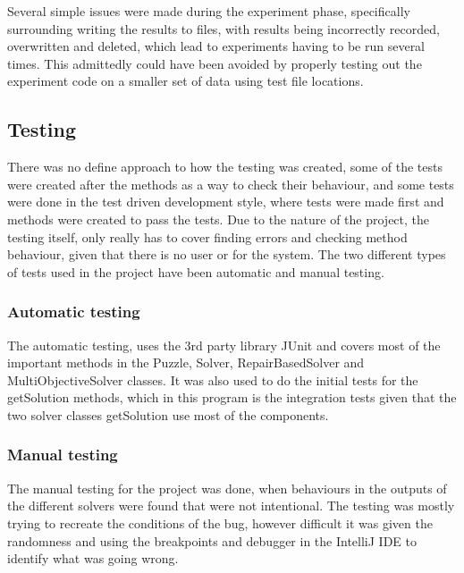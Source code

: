 \documentclass[a4paper,11pt]{article}
\begin{document}
Several simple issues were made during the experiment phase, specifically surrounding writing the results to files, with results being incorrectly recorded, overwritten and deleted, which lead to experiments having to be run several times. This admittedly could have been avoided by properly testing out the experiment code on a smaller set of data using test file locations.
\subsection{Testing }
There was no define approach to how the testing was created, some of the tests were created after the methods as a way to check their behaviour, and some tests were done in the test driven development style, where tests were made first and methods were created to pass the tests. Due to the nature of the project, the testing itself, only really has to cover finding errors and checking method behaviour, given that there is no user or for the system. The two different types of tests used in the project have been automatic and manual testing.
\subsubsection{Automatic testing}
The automatic testing, uses the 3rd party library JUnit and covers most of the important methods in the Puzzle, Solver, RepairBasedSolver and MultiObjectiveSolver classes. It was also used to do the initial tests for the getSolution methods, which in this program is the integration tests given that the two solver classes getSolution use most of the components.  
\subsubsection{Manual testing}
The manual testing for the project was done, when behaviours in the outputs of the different solvers were found that were not intentional. The testing was mostly trying to recreate the conditions of the bug, however difficult it was given the randomness and using the breakpoints and debugger in the IntelliJ IDE to identify what was going wrong.
\end{document}

